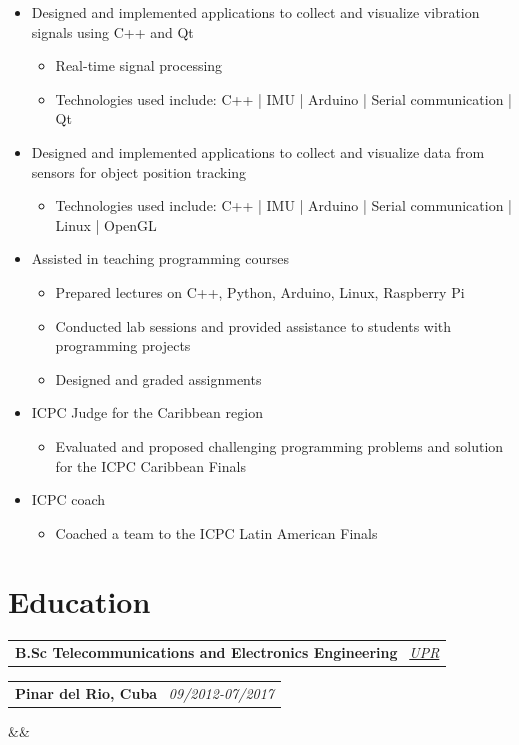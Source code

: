 \documentclass[11pt,a4paper,sans]{moderncv}
\makeatletter
\newcommand*{\customcventry}[7][.13em]{
\begin{tabular}{@{}l}
{\bfseries #4} \
{\itshape #3}
\end{tabular}
\hfill
\begin{tabular}{l@{}}
{\bfseries #5} \
{\itshape #2}
\end{tabular}
\ifx&#7&%
\else{\
\begin{minipage}{\maincolumnwidth}%
\small#7%
\end{minipage}}\fi%
\par\addvspace{#1}}
\makeatother
\begin{document}
\begin{itemize}[leftmargin=0.6cm, label={\textbullet}]
    \item Designed and implemented applications to collect and visualize vibration signals using C++ and Qt
        \begin{itemize}
            \item Real-time signal processing
            \item Technologies used include: C++ | IMU | Arduino | Serial communication | Qt
        \end{itemize}
    \item Designed and implemented applications to collect and visualize data from sensors for object position tracking
        \begin{itemize}
            \item Technologies used include: C++ | IMU | Arduino | Serial communication | Linux | OpenGL
        \end{itemize}
    \item Assisted in teaching programming courses
        \begin{itemize}
            \item Prepared lectures on C++, Python, Arduino, Linux, Raspberry Pi
            \item Conducted lab sessions and provided assistance to students with programming projects 
            \item Designed and graded assignments
        \end{itemize}
    \item ICPC Judge for the Caribbean region
        \begin{itemize}
            \item Evaluated and proposed challenging programming problems and solution for the ICPC Caribbean Finals
        \end{itemize}
    \item ICPC coach
        \begin{itemize}
            \item Coached a team to the ICPC Latin American Finals
        \end{itemize}
\end{itemize}

\section{Education}
\customcventry{09/2012-07/2017}{\color{blue}\href{https://www.upr.edu.cu/}{UPR}}
{B.Sc Telecommunications and Electronics Engineering}
{Pinar del Rio, Cuba}
{}
{}
{}
\end{document}
